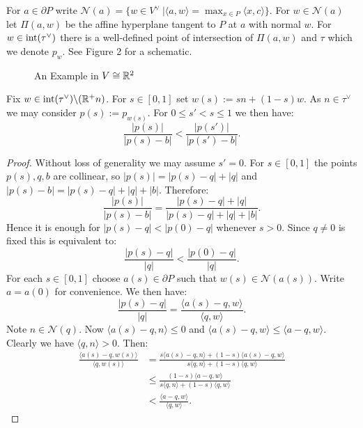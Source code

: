 For \(a \in \partial P\) write \(\mathcal{N}(a) = \{w\in V^\vee \ | \langle a,w \rangle = \max_{x \in P} \langle x,c \rangle \}\). For \(w \in \mathcal{N}(a) \) let \(\Pi(a,w)\) be the affine hyperplane tangent to \(P\) at \(a\) with normal \(w\). For \(w \in \text{int}(\tau^\vee) \) there is a well-defined point of intersection of \(\Pi(a,w)\) and \(\tau\) which we denote \(p_w\). See Figure 2 for a schematic.
\begin{figure}[h]
\caption{An Example in \(V \cong \mathbb{R}^2\)}
\label{schematic}
\end{figure}
\begin{lemma} \label{R(X):Lemma3.1}
Fix \(w \in \text{int}(\tau^\vee) \backslash (\mathbb{R}^+ n)\). For \(s \in [0,1]\) set \(w(s) := sn + (1-s)w\). As \(n \in \tau^\vee \) we may consider \(p(s) := p_{w(s)}\). For \(0 \le s' < s \le 1\) we then have:
\[
\frac{|p(s)|}{|p(s)-b|} < \frac{|p(s')|}{|p(s')-b|}.
\]
\end{lemma}
\begin{proof}
Without loss of generality we may assume \(s' = 0\). For \(s \in [0,1]\) the points \(p(s), q,b\) are collinear, so \(|p(s)|= |p(s)-q|+|q|\) and \(|p(s)-b| =|p(s)-q| +|q| + |b| \). Therefore:
\[
\frac{|p(s)|}{|p(s) - b|} = \frac{|p(s)-q|+|q|}{|p(s)-q| +|q| + |b|}.
\]
Hence it is enough for \(|p(s)-q| < |p(0)-q|\) whenever \(s >0\). Since \(q \neq 0\) is fixed this is equivalent to:
\[
\frac{|p(s) - q|}{|q|} < \frac{|p(0) - q|}{|q|}.
\]
For each \(s \in [0,1]\) choose \(a(s) \in \partial P\) such that \(w(s) \in \mathcal{N}(a(s))\). Write \(a = a(0)\) for convenience. We then have:
\[
\frac{|p(s)-q|}{|q|} = \frac{\langle a(s)-q, w \rangle }{\langle q,w \rangle}.
\]
Note \(n \in \mathcal{N}(q)\). Now \(\langle a(s)-q,n \rangle \le 0\)  and \( \langle a(s) - q,w \rangle \le \langle a - q,w \rangle\). Clearly we have \(\langle q , n \rangle > 0\). Then:
\begin{align*}
\frac{\langle a(s) - q, w(s) \rangle }{\langle q, w(s) \rangle} &= \frac{s\langle a(s)-q, n \rangle + (1-s)\langle a(s)-q,w \rangle}{s \langle q , n \rangle + (1-s) \langle q, w \rangle} \\ &\le \frac{(1-s)\langle a-q, w \rangle }{s \langle q , n \rangle + (1-s) \langle q, w \rangle} \\ &< \frac{\langle a-q, w \rangle }{\langle q,w \rangle}.
\end{align*}
\end{proof}
